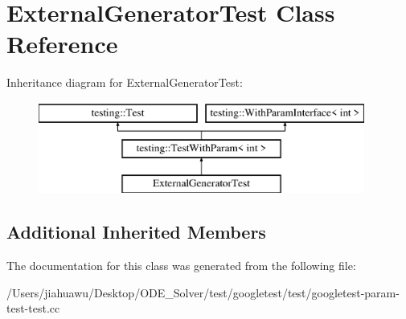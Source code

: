 \hypertarget{class_external_generator_test}{}\section{External\+Generator\+Test Class Reference}
\label{class_external_generator_test}
Inheritance diagram for External\+Generator\+Test\+:\begin{figure}[H]
\begin{center}
\leavevmode
\includegraphics[height=3.000000cm]{class_external_generator_test}
\end{center}
\end{figure}
\subsection*{Additional Inherited Members}


The documentation for this class was generated from the following file\+:\begin{DoxyCompactItemize}
\item 
/\+Users/jiahuawu/\+Desktop/\+O\+D\+E\+\_\+\+Solver/test/googletest/test/googletest-\/param-\/test-\/test.\+cc\end{DoxyCompactItemize}
